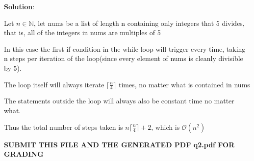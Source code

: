 \documentclass{article}
\newcommand{\cO}{\mathcal{O}}
\begin{document}
\begin{enumerate}
\textbf{Solution}:

Let $n \in \mathbb{N}$, let nums be a list of length n containing only integers that 5 divides, that is, all of the integers in nums are multiples of 5

In this case the first if condition in the while loop will trigger every time, taking n steps per iteration of the loop(since every element of nums is cleanly divisible by 5).

The loop itself will always iterate $\lceil \frac{n}{4} \rceil$ times, no matter what is contained in nums

The statements outside the loop will always also be constant time no matter what.

Thus the total number of steps taken is $n \lceil \frac{n}{4} \rceil + 2$, which is $\cO (n^2)$

\end{enumerate}
\begin{center}
\textbf{SUBMIT THIS FILE AND THE GENERATED PDF q2.pdf FOR GRADING}
\end{center}
\end{document}
